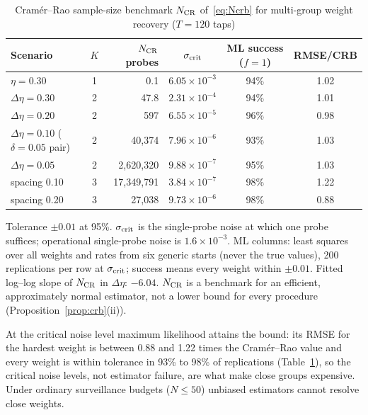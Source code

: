 \documentclass[12pt]{article}
\theoremstyle{definition}
\theoremstyle{remark}
\begin{document}
\begin{table}[t]\centering\small
\begin{threeparttable}
\caption{Cram\'er--Rao sample-size benchmark $N_{\rm CR}$ of~\eqref{eq:Ncrb} for multi-group weight recovery ($T=120$ taps)}\label{tab:crb}
\begin{tabular}{lcrccc}
\toprule
Scenario & $K$ & $N_{\rm CR}$ probes & $\sigma_{\rm crit}$ & ML success ($f=1$) & RMSE/CRB\\
\midrule
$\eta=0.30$ & 1 & 0.1 & $6.05\times10^{-3}$ & 94\% & 1.02\\
$\Delta\eta=0.30$ & 2 & 47.8 & $2.31\times10^{-4}$ & 94\% & 1.01\\
$\Delta\eta=0.20$ & 2 & 597 & $6.55\times10^{-5}$ & 96\% & 0.98\\
$\Delta\eta=0.10$ ($\delta=0.05$ pair) & 2 & 40{,}374 & $7.96\times10^{-6}$ & 93\% & 1.03\\
$\Delta\eta=0.05$ & 2 & 2{,}620{,}320 & $9.88\times10^{-7}$ & 95\% & 1.03\\
spacing 0.10 & 3 & 17{,}349{,}791 & $3.84\times10^{-7}$ & 98\% & 1.22\\
spacing 0.20 & 3 & 27{,}038 & $9.73\times10^{-6}$ & 98\% & 0.88\\
\bottomrule
\end{tabular}
\begin{tablenotes}\footnotesize\item Tolerance $\pm0.01$ at 95\%. $\sigma_{\rm crit}$ is the single-probe noise at which one probe suffices; operational single-probe noise is $1.6\times10^{-3}$. ML columns: least squares over all weights and rates from six generic starts (never the true values), 200 replications per row at $\sigma_{\rm crit}$; success means every weight within $\pm0.01$. Fitted log--log slope of $N_{\rm CR}$ in $\Delta\eta$: $-6.04$. $N_{\rm CR}$ is a benchmark for an efficient, approximately normal estimator, not a lower bound for every procedure (Proposition~\ref{prop:crb}(ii)). \end{tablenotes}
\end{threeparttable}
\end{table}

At the critical noise level maximum likelihood attains the bound: its RMSE for the hardest weight is between 0.88 and 1.22 times the Cram\'er--Rao value and every weight is within tolerance in 93\% to 98\% of replications (Table~\ref{tab:crb}), so the critical noise levels, not estimator failure, are what make close groups expensive. Under ordinary surveillance budgets ($N\le50$) unbiased estimators cannot resolve close weights.
\end{document}
